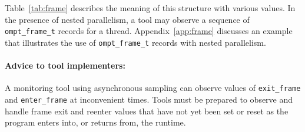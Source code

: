 \noindent
Table~\ref{tab:frame} describes the meaning of this structure with various values.
In the presence of nested parallelism, a tool may observe a sequence of \verb|ompt_frame_t| records for a thread. Appendix~\ref{app:frame} discusses  an example that illustrates the use of \verb|ompt_frame_t| records with nested parallelism.

\paragraph{Advice to tool implementers:} A monitoring tool using
      asynchronous sampling can observe values of 
      \verb|exit_frame| and \verb|enter_frame| at inconvenient times. 
      Tools must be prepared to observe and handle frame exit and reenter values that have not yet been set or reset as the program enters into, or returns from, the runtime. 



